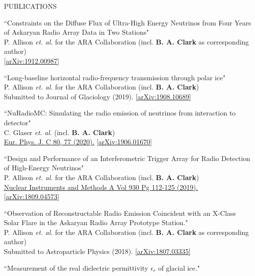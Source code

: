 \documentclass{resume} %
\begin{document}
\begin{rSection}{PUBLICATIONS}
\begin{etaremune}%
  \item ``Constraints on the Diffuse Flux of Ultra-High Energy Neutrinos from Four Years of Askaryan Radio Array Data in Two Stations" \\
 P. Allison {\it et. al.} for the ARA Collaboration (incl. \textbf{B. A. Clark} as corresponding author)\\ \href{https://arxiv.org/abs/1912.00987}{[arXiv:1912.00987]}
  \item ``Long-baseline horizontal radio-frequency transmission through polar ice" \\
 P. Allison {\it et. al.} for the ARA Collaboration (incl. \textbf{B. A. Clark})\\    Submitted to Journal of Glaciology (2019). \href{https://arxiv.org/abs/1908.10689}{[arXiv:1908.10689]}
  \item ``NuRadioMC: Simulating the radio emission of neutrinos from interaction to detector" \\
 C. Glaser {\it et. al.} (incl. \textbf{B. A. Clark})\\     \href{https://doi.org/10.1140/epjc/s10052-020-7612-8}{Eur. Phys. J. C 80, 77 (2020).} \href{https://arxiv.org/abs/1906.01670}{[arXiv:1906.01670]}
  \item ``Design and Performance of an Interferometric Trigger Array for Radio Detection of High-Energy Neutrinos" \\
 P. Allison {\it et. al.} for the ARA Collaboration (incl. \textbf{B. A. Clark}) \\    \href{https://doi.org/10.1016/j.nima.2019.01.067}{Nuclear Instruments and Methods A Vol 930 Pg 112-125 (2019).}  \href{https://arxiv.org/abs/1809.04573}{[arXiv:1809.04573]}
 \item ``Observation of Reconstructable Radio Emission Coincident with an X-Class Solar Flare in the Askaryan Radio Array Prototype Station." \\
 P. Allison {\it et. al.} for the ARA Collaboration (incl. \textbf{B. A. Clark} as corresponding author) \\
 Submitted to Astroparticle Physics (2018). \href{https://arxiv.org/abs/1807.03335}{[arXiv:1807.03335]}
  \item ``Measurement of the real dielectric permittivity $\epsilon_r$ of glacial ice." \\

\end{etaremune}
\end{rSection}
\end{document}
